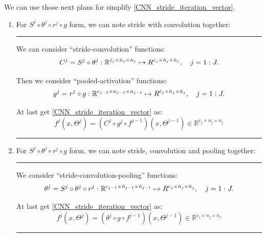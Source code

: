 We can use those next plans for simplify \eqref{CNN_stride_iteration_vector}. 
\begin{enumerate}
	\item {\color{red} For $S^j \circ \theta^j\circ r^j\circ g$ form,} we can note stride with convolution together:
	\bigskip \hrule \bigskip 
	We can consider ``stride-convolution'' functions:
	\begin{equation}\label{CNN_iteration_vector}
	C^j =S^j\circ \theta^j:  \mathbb R^{\hat c_{j} \times\hat n_{j} \times\hat n_{j} }\mapsto
	\mathbb  \mathbb R^{c_j \times \tilde n_{j} \times \tilde n_j }, \quad j  = 1:J. 
	\end{equation}
	
	Then we consider ``pooled-activation'' functions:
	\begin{equation}\label{CNN_iteration_vector}
	g^j=r^j\circ g:  \mathbb R^{c_{j-1} \times n_{j-1} \times n_{j-1} }\mapsto
	\mathbb  \mathbb R^{\hat c_j \times \hat n_{j} \times \hat n_j }, \quad j  = 1:J. 
	\end{equation}
	
	At last get \eqref{CNN_stride_iteration_vector} as:
	\begin{equation}\label{CNN_stride_iteration_vector_1}
	f^j(x,\Theta^j) = (C^j \circ g^j\circ f^{j-1})(x,\Theta^{j-1}) \in \mathbb{R}^{c_j \times n_j \times n_j }
	\end{equation}
	
	
	\bigskip \hrule \bigskip  
	
	\item {\color{red} For $S^j \circ \theta^j\circ r^j\circ g$ form,} we can note stride, convolution and pooling together:
	
	\bigskip \hrule \bigskip  
	We consider ``stride-convolution-pooling'' functions:
	\begin{equation}\label{CNN_iteration_vector}
	\theta^j=S^j\circ \theta^j \circ r^j:  \mathbb R^{c_{j-1} \times \tilde n_{j-1} \times\tilde n_{j-1} }\mapsto
	\mathbb  \mathbb R^{c_j \times \tilde n_{j} \times \tilde n_j }, \quad j  = 1:J. 
	\end{equation}
	
	At last get \eqref{CNN_stride_iteration_vector} as:
	\begin{equation}\label{CNN_stride_iteration_vector_2}
	f^j(x,\Theta^j) = (\theta^j \circ g\circ f^{j-1})(x,\Theta^{j-1}) \in \mathbb{R}^{c_j \times n_j \times n_j }
	\end{equation}
	\bigskip \hrule \bigskip  
	
	
	

\end{enumerate}
